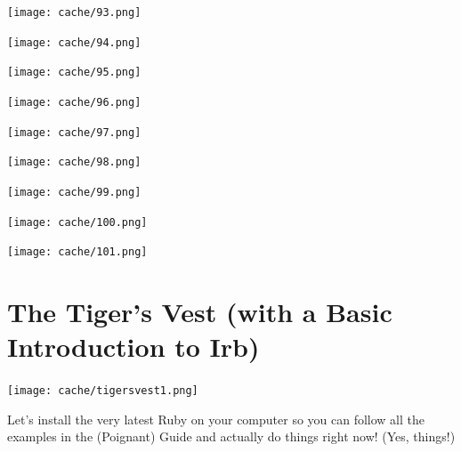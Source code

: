 \documentclass[12pt,twoside]{report}
\begin{document}
\vspace*{0.6cm} \texttt{[image: cache/93.png]}
\newpage

\vspace*{0.6cm} \texttt{[image: cache/94.png]}
\newpage

\vspace*{0.6cm} \texttt{[image: cache/95.png]}
\newpage

\vspace*{0.6cm} \texttt{[image: cache/96.png]}
\newpage

\vspace*{0.6cm}
\texttt{[image: cache/97.png]}
\newpage

\vspace*{0.6cm} \texttt{[image: cache/98.png]}
\newpage

\vspace*{0.6cm} \texttt{[image: cache/99.png]}
\newpage

\vspace*{0.6cm} \texttt{[image: cache/100.png]}
\newpage

\vspace*{0.6cm} \texttt{[image: cache/101.png]}
\newpage
\thispagestyle{empty}
\mbox{}
\newpage
\thispagestyle{empty}
\mbox{}

\cleartooddpage

\appendix
\renewcommand*{\thechapter}{\Roman{chapter}}
\chapter{The Tiger's Vest (with a Basic Introduction to Irb)}
\newpage
\thispagestyle{empty}
\mbox{}
\pagebreak

\texttt{[image: cache/tigersvest1.png]}
\newpage

Let's install the very latest Ruby on your computer so you can follow
all the examples in the (Poignant) Guide and actually do things right
now! (Yes, things!)
\end{document}

